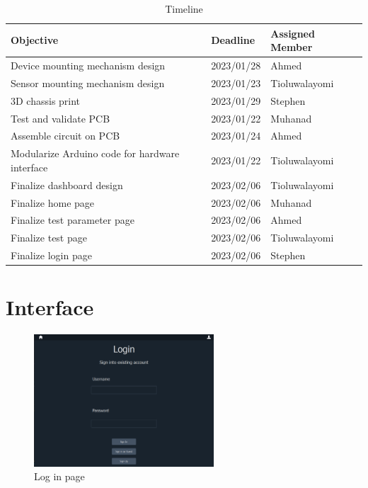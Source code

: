 \documentclass[12pt, titlepage]{article}
\begin{document}
\begin{table}[!h]
  \begin{tabular}{| p{} | p{}| p{}|}
    \hline
    \rowcolor[gray]{0.9}
    Objective & Deadline & Assigned Member\\
    \hline
    Device mounting mechanism design & 2023/01/28 & Ahmed\\
    \hline
    Sensor mounting mechanism design &  2023/01/23 & Tioluwalayomi\\
    \hline
    3D chassis print & 2023/01/29 & Stephen \\
    \hline
    Test and validate PCB & 2023/01/22 & Muhanad \\
    \hline
    Assemble circuit on PCB & 2023/01/24 & Ahmed \\
    \hline
    Modularize Arduino code for hardware interface & 2023/01/22 & Tioluwalayomi \\
    \hline
    Finalize dashboard design & 2023/02/06 & Tioluwalayomi \\
    \hline
    Finalize home page & 2023/02/06 & Muhanad \\
    \hline
    Finalize test parameter page & 2023/02/06 & Ahmed\\
    \hline
    Finalize test page & 2023/02/06 & Tioluwalayomi\\
    \hline
    Finalize login page & 2023/02/06 & Stephen\\
    \hline
   
  \end{tabular}
  \caption{Timeline}
\end{table}


% 

\newpage{}

\appendix

\section{Interface}
  \begin{figure}[h!]
    \begin{center}
    \includegraphics[width=0.6\textwidth]{login_page}
    \caption{Log in page}
    \label{Fig_SystemContext} 
    \end{center}
    \end{figure}
\end{document}
